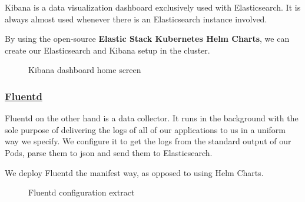 Kibana is a data visualization dashboard exclusively used with Elasticsearch.
It is always almost used whenever there is an Elasticsearch instance involved.

By using the open-source \textbf{Elastic Stack Kubernetes Helm Charts}, we can create our Elasticsearch and Kibana setup in the cluster.
\begin{figure}[H]
    \centering
    \caption{Kibana dashboard home screen}
    \label{fig:kibana-dashboard-home}
\end{figure}

\subsubsection*{\underline{Fluentd}}
Fluentd on the other hand is a data collector.
It runs in the background with the sole purpose of delivering the logs of all of our applications to us in a uniform way we specify.
We configure it to get the logs from the standard output of our Pods, parse them to json and send them to Elasticsearch.

We deploy Fluentd the manifest way, as opposed to using Helm Charts.
\begin{figure}[H]
    \centering
    \caption{Fluentd configuration extract}
    \label{fig:fluentd-config-snippet}
\end{figure}

